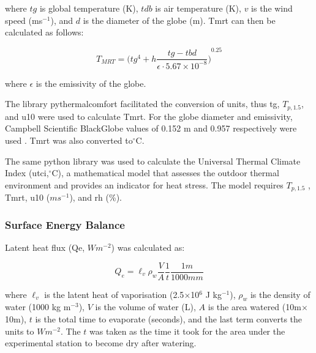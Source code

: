 \documentclass[final,3p,times,authoryear]{elsarticle}
\begin{document}
where $tg$ is global temperature (K), $tdb$ is air temperature (K), $v$ is the wind speed (ms$^{-1}$), and $d$ is the diameter of the globe (m). \gls{Tmrt} can then be calculated as follows:

\begin{equation}
T_{MRT}=  {  \bigg( tg^{4} + h \frac{tg - tbd}{\epsilon \cdot 5.67\times 10^{-8}} \bigg)}^{0.25}
\label{eq:7.10}
\end{equation}

where $\epsilon$ is the emissivity of the globe.

The library pythermalcomfort facilitated the conversion of units, thus \gls{tg}, $T_{p,1.5}$, and \gls{u10} were used to calculate \gls{Tmrt}. For the globe diameter and emissivity, Campbell Scientific BlackGlobe values of 0.152 m and 0.957 respectively were used \citep{CampbellScientific2022}. \gls{Tmrt} was also converted to$^{\circ}$C.

The same python library was used to calculate the Universal Thermal Climate Index (\gls{utci},$^{\circ}$C), a mathematical model that assesses the outdoor thermal environment and provides an indicator for heat stress. The model requires $T_{p,1.5}$ , \gls{Tmrt}, \gls{u10} ($ms^{-1}$), and \gls{rh} (\%).



\subsubsection{Surface Energy Balance}\label{sec:appendix7.4.5}

Latent heat flux (\gls{Qe}, $Wm^{-2}$) was calculated as:

\begin{equation}
Q_{e} = \ell _{v} \rho_{w} \frac{V}{A} \frac{1}{t} \frac{1m}{1000mm}
\label{eq:7.11}
\end{equation}

where $\ell _{v}$ is the latent heat of vaporisation (2.5$\times$10$^{6}$ J kg$^{-1}$), $\rho_{w}$ is the density of water (1000 kg m$^{-3}$), $V$ is the volume of water (L), $A$ is the area watered (10m$\times$10m), $t$ is the total time to evaporate (seconds), and the last term converts the units to $Wm^{-2}$. The $t$ was taken as the time it took for the area under the experimental station to become dry after watering.
\end{document}

